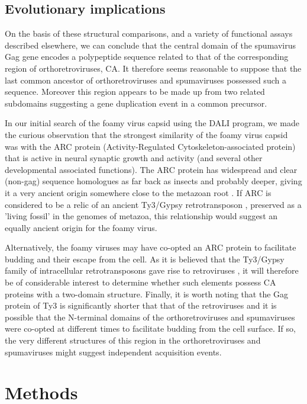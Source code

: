 \documentclass[12pt]{article}
\newcommand{\3}{$3_{10}$}
\begin{document}
\subsection{Evolutionary implications}

On the basis of these structural comparisons, and a variety of functional assays described elsewhere, we can
conclude that the central domain of the spumavirus Gag gene encodes a polypeptide sequence related to that of
the corresponding region of orthoretroviruses, CA. It therefore seems reasonable to suppose that the last
common ancestor of orthoretroviruses and spumaviruses possessed such a sequence. Moreover this region appears
to be made up from two related subdomains suggesting a gene duplication event in a common precursor.

In our initial search of the foamy virus capsid using the DALI program, we made
the curious observation that the strongest similarity of the foamy virus capsid
was with the ARC protein (Activity-Regulated Cytoskeleton-associated protein) that
is active in neural synaptic growth and activity (and several other developmental associated functions).
The ARC protein has widespread and clear (non-gag) sequence homologues as far back as insects and probably
deeper, giving it a very ancient origin somewhere close to the metazoan root \cite{CampillosMet06}.
If ARC is considered to be a relic of an ancient Ty3/Gypsy retrotransposon \cite{ZhangWet15}, preserved
as a 'living fossil' in the genomes of metazoa, this relationship would suggest an equally
ancient origin for the foamy virus. 

Alternatively,
the foamy viruses may have co-opted an ARC protein to facilitate budding and their escape from the cell.
As it is believed that the Ty3/Gypsy family of intracellular retrotransposons gave rise to retroviruses
\cite{LlorensCet08}, 
it will therefore be of considerable interest to determine whether such elements possess CA proteins with
a two-domain structure. Finally, it is worth noting that the Gag protein of Ty3 is significantly shorter 
that that of the retroviruses and it is possible that the N-terminal domains of the orthoretroviruses 
and spumaviruses were co-opted at different times to facilitate budding from the cell surface. 
If so, the very different structures of this region in the orthoretroviruses and spumaviruses might suggest 
independent acquisition events. 
\clearpage
%
\section{Methods}
\end{document}

